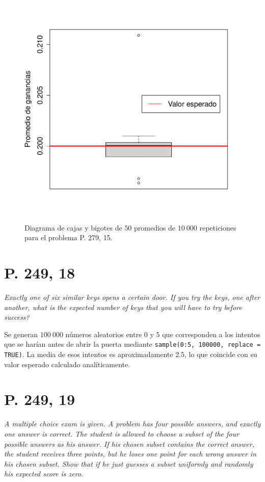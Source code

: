 \documentclass[paper=leter, fontsize=11pt]{scrartcl}
\begin{document}
\begin{figure}
    \centering
    \includegraphics[width=1\textwidth]{249_15.pdf}
    \caption{Diagrama de cajas y bigotes de $50$ promedios de $10\ 000$ repeticiones para el problema P. 279, 15.}
    \label{fig:249_15}
\end{figure}

\section*{P. 249, 18}
\emph{Exactly one of six similar keys opens a certain door. If you try the keys, one after another, what is the expected number of keys that you will have to try before success?}

Se generan $100\ 000$ números aleatorios entre $0$ y $5$ que corresponden a los intentos que se harían antes de abrir la puerta mediante \texttt{sample(0:5, 100000, replace = TRUE)}. La media de esos intentos es aproximadamente $2.5$, lo que coincide con su valor esperado calculado analíticamente.

\section*{P. 249, 19}
\emph{A multiple choice exam is given. A problem has four possible answers, and exactly one answer is correct. The student is allowed to choose a subset of the four possible answers as his answer. If his chosen subset contains the correct answer, the student receives three points, but he loses one point for each wrong answer in his chosen subset. Show that if he just guesses a subset uniformly and randomly his expected score is zero.}
\end{document}
